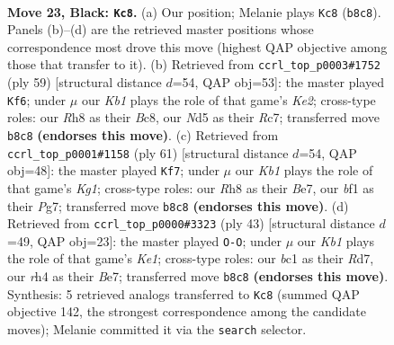 \documentclass[11pt]{article}
\begin{document}
\clearpage

\begin{figure}[p]\centering
\begin{subfigure}{0.46\textwidth}\centering
\resizebox{\linewidth}{!}{%
\newchessgame
\chessboard[
  setfen={rk3b1r/pp6/8/P1PnpP1p/1P5R/8/8/R1B1KB2 b Q - 0 23},
  showmover=false,
  pgfstyle=straightmove, color=movearrow, markmove={b8-c8}
]}
\caption{}
\end{subfigure}\hfill
\begin{subfigure}{0.46\textwidth}\centering
\resizebox{\linewidth}{!}{%
\newchessgame
\chessboard[
  setfen={2b5/p1r1kp2/1p6/4p1rp/P1P1R3/1P1B2P1/1K3P2/3R4 b - - 0 30},
  showmover=false,
  pgfstyle=straightmove, color=movearrow, markmove={e7-f6}
]}
\caption{}
\end{subfigure}
\\[4pt]
\begin{subfigure}{0.46\textwidth}\centering
\resizebox{\linewidth}{!}{%
\newchessgame
\chessboard[
  setfen={2r3k1/4b1pp/p1rp4/3Rp2P/4P3/BP3P2/2P1R3/1K6 b - - 0 31},
  showmover=false,
  pgfstyle=straightmove, color=movearrow, markmove={g8-f7}
]}
\caption{}
\end{subfigure}\hfill
\begin{subfigure}{0.46\textwidth}\centering
\resizebox{\linewidth}{!}{%
\newchessgame
\chessboard[
  setfen={4k2r/3rbppp/R3p3/2p1P3/7P/1P2B1P1/5P2/5RK1 b k - 2 22},
  showmover=false,
  pgfstyle=straightmove, color=movearrow, markmove={e8-g8}
]}
\caption{}
\end{subfigure}
\caption{\textbf{Move 23, Black: \texttt{Kc8}.} (a) Our position; Melanie plays \texttt{Kc8} (\texttt{b8c8}). Panels (b)--(d) are the retrieved master positions whose correspondence most drove this move (highest QAP objective among those that transfer to it). (b) Retrieved from \texttt{ccrl\_top\_p0003\#1752} (ply 59) [structural distance $d$=54, QAP obj=53]: the master played \texttt{Kf6}; under $\mu$ our \emph{Kb1} plays the role of that game's \emph{Ke2}; cross-type roles: our \emph{R}h8 as their \emph{B}c8, our \emph{N}d5 as their \emph{R}c7; transferred move \texttt{b8c8} \textbf{(endorses this move)}. (c) Retrieved from \texttt{ccrl\_top\_p0001\#1158} (ply 61) [structural distance $d$=54, QAP obj=48]: the master played \texttt{Kf7}; under $\mu$ our \emph{Kb1} plays the role of that game's \emph{Kg1}; cross-type roles: our \emph{R}h8 as their \emph{B}e7, our \emph{b}f1 as their \emph{P}g7; transferred move \texttt{b8c8} \textbf{(endorses this move)}. (d) Retrieved from \texttt{ccrl\_top\_p0000\#3323} (ply 43) [structural distance $d$=49, QAP obj=23]: the master played \texttt{O-O}; under $\mu$ our \emph{Kb1} plays the role of that game's \emph{Ke1}; cross-type roles: our \emph{b}c1 as their \emph{R}d7, our \emph{r}h4 as their \emph{B}e7; transferred move \texttt{b8c8} \textbf{(endorses this move)}. Synthesis: 5 retrieved analogs transferred to \texttt{Kc8} (summed QAP objective 142, the strongest correspondence among the candidate moves); Melanie committed it via the \texttt{search} selector.}
\label{fig:thought-m45}
\end{figure}
\end{document}

